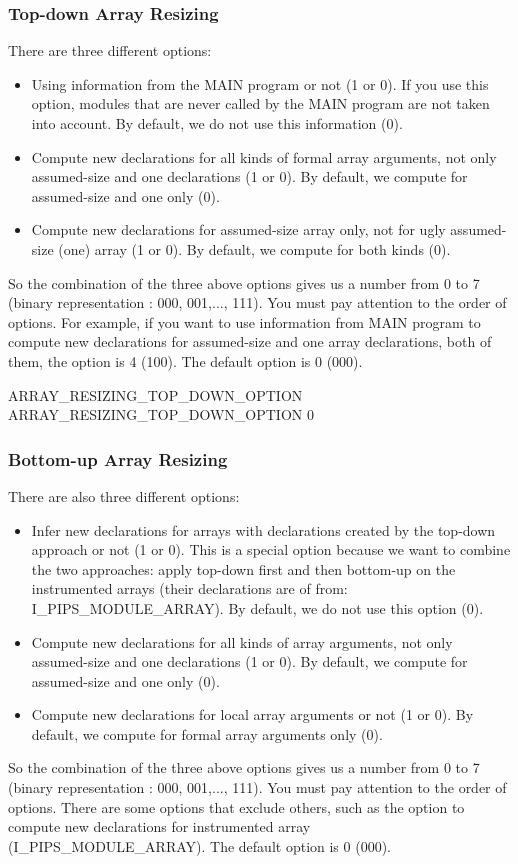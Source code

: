 \documentclass[a4paper]{report}
\begin{document}
\subsubsection*{Top-down Array Resizing}
There are three different options:
\begin{itemize}
\item Using information from the MAIN program or not (1 or 0). If you use
  this option, modules that are never called by the MAIN program are not
  taken into account. By default, we do not use this information (0).
\item Compute new declarations for all kinds of formal array arguments,
  not only assumed-size and one declarations (1 or 0). By default, we
  compute for assumed-size and one only (0).
\item Compute new declarations for assumed-size array only, not for ugly
  assumed-size (one) array (1 or 0). By default, we compute for both kinds
  (0).
\end{itemize}
So the combination of the three above options gives us a number from 0 to
7 (binary representation : 000, 001,..., 111). You must pay attention to
the order of options. For example, if you want to use information from
MAIN program to compute new declarations for assumed-size and one array
declarations, both of them, the option is 4 (100). The default option is 0
(000).

\begin{PipsProp}{ARRAY_RESIZING_TOP_DOWN_OPTION}
ARRAY_RESIZING_TOP_DOWN_OPTION 0
\end{PipsProp}

\subsubsection*{Bottom-up Array Resizing}

There are also three different options:
\begin{itemize}
\item Infer new declarations for arrays with declarations created by the
  top-down approach or not (1 or 0). This is a special option because we
  want to combine the two approaches: apply top-down first and then
  bottom-up on the instrumented arrays (their declarations are of from:
  I\_PIPS\_MODULE\_ARRAY). By default, we do not use this option (0).
\item Compute new declarations for all kinds of array arguments,
  not only assumed-size and one declarations (1 or 0). By default, we
  compute for assumed-size and one only (0).
\item Compute new declarations for local array arguments or not (1 or 0). By default, we
  compute for formal array arguments only (0).
\end{itemize}
So the combination of the three above options gives us a number from 0 to
7 (binary representation : 000, 001,..., 111). You must pay attention to
the order of options. There are some options that exclude others, such as
the option to compute new declarations for instrumented array
(I\_PIPS\_MODULE\_ARRAY). The default option is 0
(000).
\end{document}
